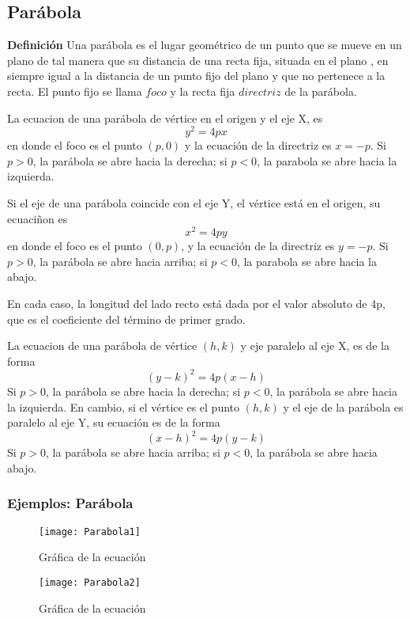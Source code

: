 \documentclass[12pt,a4paper]{article} %
\begin{document}
\newpage
\subsection{Parábola} \label{subsec:parabola}
\textbf{Definición} Una parábola es el lugar geométrico de un punto que se mueve en un plano de tal manera que su distancia de una recta fija, situada en el plano , en siempre igual a la distancia de un punto fijo del plano y que no pertenece a la recta.
El punto fijo se llama $foco$ y la recta fija $directriz$ de la parábola.

La ecuacion de una parábola de vértice en el origen y el eje X, es 
$$y^2 = 4px$$
en donde el foco es el punto $(p,0)$ y la ecuación de la directriz es $x = -p$. Si $p > 0$, la parábola se abre hacia la derecha; si $p < 0$, la parabola se abre hacia la izquierda.

Si el eje de una parábola coincide con el eje Y, el vértice está en el origen, su ecuaciñon es 
$$x^2 = 4py$$
en donde el foco es el punto $(0,p)$, y la ecuación de la directriz es $y = -p$. Si $p > 0$, la parábola se abre hacia arriba; si $p < 0$, la parabola se abre hacia la abajo.

En cada caso, la longitud del lado recto está dada por el valor absoluto de 4p, que es el coeficiente del término de primer grado.

La ecuacion de una parábola de vértice $(h,k)$ y eje paralelo al eje X, es de la forma
$$(y - k)^2 = 4p(x - h)$$
Si $p > 0$, la parábola se abre hacia la derecha; si $p < 0$, la parábola se abre hacia la izquierda.
En cambio, si el vértice es el punto $(h,k)$ y el eje de la parábola es paralelo al eje Y, su ecuación es de la forma 
$$(x - h)^2 = 4p(y - k)$$
Si $p > 0$, la parábola se abre hacia arriba; si $p < 0$, la parábola se abre hacia abajo.

\subsubsection{Ejemplos: Parábola}

\begin{figure}[h]
\centering
\texttt{[image: Parabola1]}
\caption{Gráfica de la ecuación }
\label{fig:Parabola}
\end{figure}

\begin{figure}[ht]
\centering
\texttt{[image: Parabola2]}
\caption{Gráfica de la ecuación }
\label{fig:Parabola2}
\end{figure}
\end{document}
